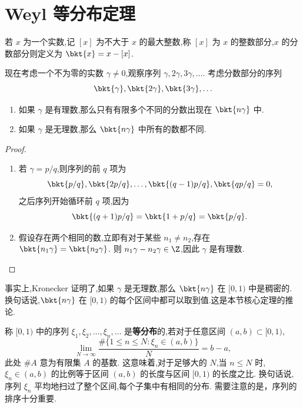 \section{Weyl 等分布定理}

若 $x$ 为一个实数,记 $[x]$ 为不大于 $x$ 的最大整数,称 $[x]$ 为 $x$ 的整数部分,$x$ 的分数部分则定义为 $\bkt{x}=x-[x]$.

现在考虑一个不为零的实数 $\gamma\neq0$,观察序列 $\gamma,2\gamma,3\gamma,\ldots$. 考虑分数部分的序列
\[
\bkt{\gamma},\bkt{2\gamma},\bkt{3\gamma},\ldots
\]

\begin{proposition}
\begin{enumerate}
\item 如果 $\gamma$ 是有理数,那么只有有限多个不同的分数出现在 $\bkt{n\gamma}$ 中.
\item 如果 $\gamma$ 是无理数,那么 $\bkt{n\gamma}$ 中所有的数都不同.
\end{enumerate}
\end{proposition}

\begin{proof}
\begin{enumerate}
	\item 若 $\gamma=p/q$,则序列的前 $q$ 项为
	\[
	\bkt{p/q},\bkt{2p/q},\ldots,\bkt{(q-1)p/q},\bkt{qp/q}=0,
	\]
	之后序列开始循环前 $q$ 项,因为
	\[
	\bkt{(q+1)p/q}=\bkt{1+p/q}=\bkt{p/q}.
	\]
	\item 假设存在两个相同的数,立即有对于某些 $n_1\neq n_2$,存在 $\bkt{n_1\gamma}=\bkt{n_2\gamma}$. 则 $n_1\gamma-n_2\gamma\in\Z$,因此 $\gamma$ 是有理数.
\end{enumerate}	
\end{proof}

事实上,Kronecker 证明了,如果 $\gamma$ 是无理数,那么 $\bkt{n\gamma}$ 在 $[0,1)$ 中是稠密的. 换句话说,$\bkt{n\gamma}$ 在 $[0,1)$ 的每个区间中都可以取到值.这是本节核心定理的推论.

\begin{definition}
称 $[0,1)$ 中的序列 $\xi_1,\xi_2,\ldots,\xi_n,\ldots$ 是\textbf{等分布}的,若对于任意区间 $(a,b)\subset[0,1)$,
\[
\lim_{N\to\infty}\frac{\#\{1\leq n\leq N:\xi_n\in(a,b)\}}{N}=b-a,
\]
此处 $\#A$ 意为有限集 $A$ 的基数. 这意味着,对于足够大的 $N$,当 $n\leq N$ 时,$\xi_n\in(a,b)$ 的比例等于区间 $(a,b)$ 的长度与区间 $[0,1)$ 的长度之比. 换句话说,序列 $\xi_n$ 平均地扫过了整个区间,每个子集中有相同的分布. 需要注意的是，序列的排序十分重要.
\end{definition}

